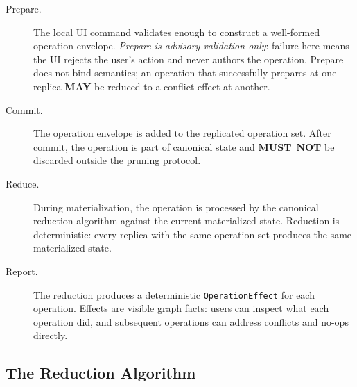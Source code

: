 \documentclass[11pt,letterpaper]{report}
\newcommand{\MUSTNOT}{\textbf{MUST}\nobreak\ \textbf{NOT}}
\newcommand{\MAY}{\textbf{MAY}}
\begin{document}
\begin{description}
  \item[Prepare.] The local UI command validates enough to construct
    a well-formed operation envelope. \emph{Prepare is advisory
    validation only}: failure here means the UI rejects the user's
    action and never authors the operation. Prepare does not bind
    semantics; an operation that successfully prepares at one replica
    \MAY{} be reduced to a conflict effect at another.
  \item[Commit.] The operation envelope is added to the replicated
    operation set. After commit, the operation is part of canonical
    state and \MUSTNOT{} be discarded outside the pruning protocol.
  \item[Reduce.] During materialization, the operation is processed
    by the canonical reduction algorithm against the current
    materialized state. Reduction is deterministic: every replica
    with the same operation set produces the same materialized
    state.
  \item[Report.] The reduction produces a deterministic
    \texttt{OperationEffect} for each operation. Effects are visible
    graph facts: users can inspect what each operation did, and
    subsequent operations can address conflicts and no-ops directly.
\end{description}

\subsection{The Reduction Algorithm}
\end{document}
